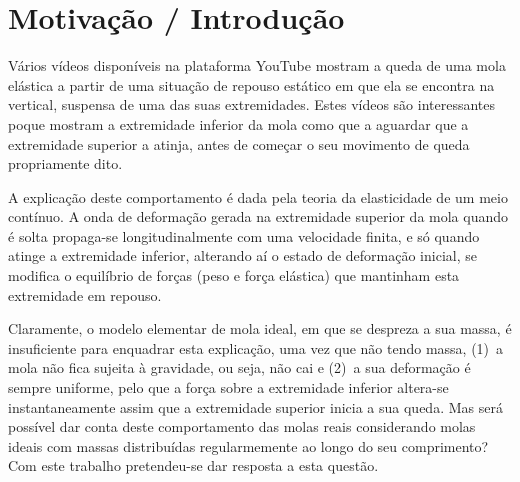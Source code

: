 \documentclass{article}
\begin{document}
\section*{Motivação / Introdução}
  Vários vídeos disponíveis na plataforma YouTube mostram a queda de uma mola
  elástica a partir de uma situação de repouso estático em que ela se encontra
  na vertical, suspensa de uma das suas extremidades. Estes vídeos são
  interessantes poque mostram a extremidade inferior da mola como que a aguardar
  que a extremidade superior a atinja, antes de começar o seu movimento de queda
  propriamente dito. 
	
  A explicação deste comportamento é dada pela teoria da elasticidade de um meio
  contínuo. A onda de deformação gerada na extremidade superior da mola quando é
  solta propaga-se longitudinalmente com uma velocidade finita, e só quando
  atinge a extremidade inferior, alterando aí o estado de deformação inicial, se
  modifica o equilíbrio de forças (peso e força elástica) que mantinham esta
  extremidade em repouso.
	
  Claramente, o modelo elementar de mola ideal, em que se despreza a sua massa,
  é insuficiente para enquadrar esta explicação, uma vez que não tendo massa,
  (1)~a mola não fica sujeita à gravidade, ou seja, não cai e (2)~a sua
  deformação é sempre uniforme, pelo que a força sobre a extremidade inferior
  altera-se instantaneamente assim que a extremidade superior inicia a sua
  queda. Mas será possível dar conta deste comportamento das molas reais
  considerando molas ideais com massas distribuídas regularmemente ao longo do
  seu comprimento? Com este trabalho pretendeu-se dar resposta a esta questão.
\end{document}
